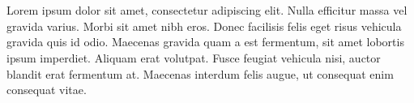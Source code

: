 \section{}

\vspace{8pt} %

Lorem ipsum dolor sit amet, consectetur adipiscing elit. Nulla efficitur massa vel gravida varius. Morbi sit amet nibh eros. Donec facilisis felis eget risus vehicula gravida quis id odio. Maecenas gravida quam a est fermentum, sit amet lobortis ipsum imperdiet. Aliquam erat volutpat. Fusce feugiat vehicula nisi, auctor blandit erat fermentum at. Maecenas interdum felis augue, ut consequat enim consequat vitae.